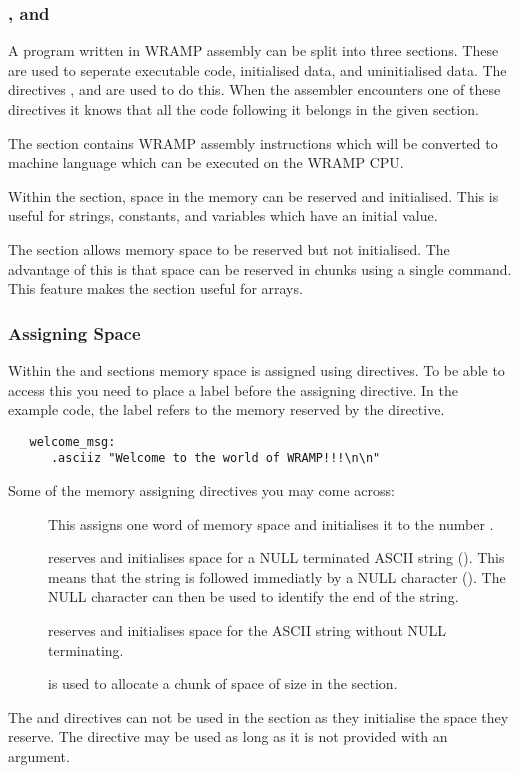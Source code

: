 \subsubsection{\text, \data and \bss}
A program written in WRAMP assembly can be split into three sections.
These are used to seperate executable code, initialised data, and
uninitialised data.  The directives \text, \data and \bss are used to
do this.  When the assembler encounters one of these directives it
knows that all the code following it belongs in the given section.

The \text section contains WRAMP assembly instructions which will be
converted to machine language which can be executed on the WRAMP CPU.

Within the \data section, space in the memory can be reserved and
initialised.  This is useful for strings, constants, and variables
which have an initial value.

The \bss section allows memory space to be reserved but not initialised.  The
advantage of this is that space can be reserved in chunks using a single
command.  This feature makes the \bss section useful for arrays. 

\subsubsection{Assigning Space}
Within the \data and \bss sections memory space is assigned using directives. 
To be able
to access this you need to place a label before the assigning directive. In the
example code, the label  refers to the memory reserved 
by the \asciiz directive.
%
\begin{verbatim}
   welcome_msg:
      .asciiz "Welcome to the world of WRAMP!!!\n\n"
\end{verbatim}



Some of the memory assigning directives you may come across:
\begin{description}

\item[\word {}]  This assigns one word of memory space and 
initialises it to the number .

\item[\asciiz {}] reserves and initialises space 
for a NULL terminated ASCII string ().
This means that the string is followed immediatly by a NULL
character ().  The NULL character can then be used
to identify the end of the string.

\item[\ascii {}] reserves and initialises space for 
the ASCII string  without NULL terminating.

\item[\Space {}] is used to allocate a chunk of space 
of size  in the \bss section.

\end{description}
The \ascii and \asciiz directives can not be used in the \bss section
as they initialise the space they reserve.  The \word directive may be
used as long as it is not provided with an argument.

